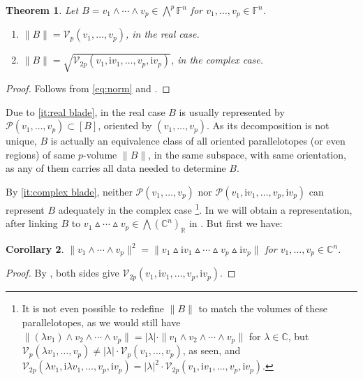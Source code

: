 \documentclass{birkjour}
\newcommand{\OMIT}[1]{\todo[color=gray!30]{#1}}  %
\newtheorem{theorem}{Theorem}[section]
\newtheorem{corollary}[theorem]{Corollary}
\theoremstyle{definition}
\def\R			{\mathds{R}}
\def\C			{\mathds{C}}
\def\F			{\mathds{F}}
\def\VV			{\mathcal{V}}
\def\PP			{\mathcal{P}}
\def\im	 					{\mathrm{i}}				%
\def\rwedge			{\mathbin{\vartriangle}}
\def\cwedge			{\wedge}
\begin{document}
\begin{theorem}\label{pr:blade norms}
	Let $B = v_1 \wedge \cdots \wedge v_p \in \bigwedge^p \F^n$ for $v_1,\ldots,v_p \in \F^n$.
	\begin{enumerate}[label = (\roman*)]
		\item $\|B\|=\VV_p(v_1,\ldots,v_p)$, in the real case.\label{it:real blade}
		
		\item $\|B\| = \sqrt{\VV_{2p}(v_1,\im v_1,\ldots,v_p,\im v_p)}$, in the complex case.\label{it:complex blade}
	\end{enumerate}
\end{theorem}
\begin{proof}
	Follows from \eqref{eq:norm} and .
\end{proof}

Due to \ref{it:real blade}, in the real case
$B$ is usually represented by $\PP(v_1,\ldots,v_p) \subset [B]$, oriented by $(v_1,\ldots,v_p)$.
As its decomposition is not unique, $B$ is actually an equivalence class of all oriented parallelotopes (or even regions) of same $p$-volume $\|B\|$, in the same subspace, with same orientation, as any of them carries all data needed to determine $B$.


By \ref{it:complex blade}, neither $\PP(v_1,\ldots,v_p)$ nor $\PP(v_1,\im v_1,\ldots,v_p,\im v_p)$ can represent $B$ adequately in the complex case%
	\footnote{It is not even possible to redefine $\|B\|$ to match the volumes of these parallelotopes,
	as we would still have $\|(\lambda v_1)\wedge v_2\wedge\cdots\wedge v_p\| = |\lambda|\cdot \|v_1\wedge v_2\wedge\cdots\wedge v_p\|$ for $\lambda \in \C$, but  
	$\VV_p(\lambda v_1,\ldots,v_p) \neq |\lambda| \cdot \VV_p(v_1,\ldots,v_p)$,
	as seen, and $\VV_{2p}(\lambda v_1,\im \lambda  v_1,\ldots,v_p,\im v_p) = |\lambda|^2 \cdot \VV_{2p}(v_1,\im v_1,\ldots,v_p,\im v_p)$.}.
In  we will obtain a representation, after linking $B$ to $v_1\rwedge \cdots \rwedge v_p \in \bigwedge(\C^n)_\R$ in .
	\OMIT{\ref{pr:blades complex real}}
But first we have:


\begin{corollary}\label{pr:norm cwedge}
	$\|v_1\cwedge \cdots \cwedge v_p\|^2 = \|v_1 \rwedge \im v_1 \rwedge \cdots \rwedge v_p \rwedge \im v_p\|$ for $v_1,\ldots, v_p \in \C^n$.
\end{corollary}
\begin{proof}
	By , both sides give $\VV_{2p}(v_1,\im v_1,\ldots,v_p,\im v_p)$.
\end{proof}
\end{document}
